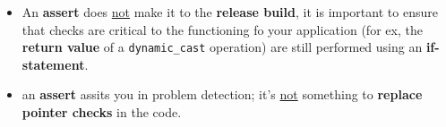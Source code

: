 \documentclass[10pt]{article}
\newcommand{\pbreak}{\vspace{30pt}}
\begin{document}
\pbreak

\begin{tcolorbox}
	\begin{itemize}
		\item An \textbf{assert} does \underline{not} make it to the \textbf{release build}, it is important to ensure that checks are critical to the functioning fo your application (for ex, the \textbf{return value} of a \verb|dynamic_cast| operation) are still performed using an \textbf{if-statement}.

		\item an \textbf{assert} assits you in problem detection; it's \underline{not} something to \textbf{replace pointer checks} in the code.
	\end{itemize}
\end{tcolorbox}

\newpage
\end{document}
